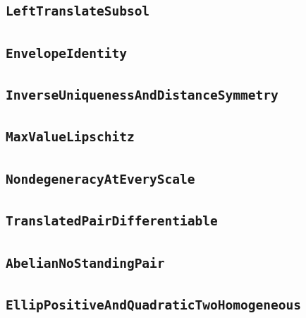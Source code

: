 \documentclass[11pt]{amsart}
\theoremstyle{definition}
\begin{document}
\subsection{\texorpdfstring{\texttt{LeftTranslateSubsol}}{LeftTranslateSubsol}}\label{node:LeftTranslateSubsol}


\subsection{\texorpdfstring{\texttt{EnvelopeIdentity}}{EnvelopeIdentity}}\label{node:EnvelopeIdentity}


\subsection{\texorpdfstring{\texttt{InverseUniquenessAndDistanceSymmetry}}{InverseUniquenessAndDistanceSymmetry}}\label{node:InverseUniquenessAndDistanceSymmetry}


\subsection{\texorpdfstring{\texttt{MaxValueLipschitz}}{MaxValueLipschitz}}\label{node:MaxValueLipschitz}


\subsection{\texorpdfstring{\texttt{NondegeneracyAtEveryScale}}{NondegeneracyAtEveryScale}}\label{node:NondegeneracyAtEveryScale}


\subsection{\texorpdfstring{\texttt{TranslatedPairDifferentiable}}{TranslatedPairDifferentiable}}\label{node:TranslatedPairDifferentiable}


\subsection{\texorpdfstring{\texttt{AbelianNoStandingPair}}{AbelianNoStandingPair}}\label{node:AbelianNoStandingPair}


\subsection{\texorpdfstring{\texttt{EllipPositiveAndQuadraticTwoHomogeneous}}{EllipPositiveAndQuadraticTwoHomogeneous}}\label{node:EllipPositiveAndQuadraticTwoHomogeneous}

\end{document}
